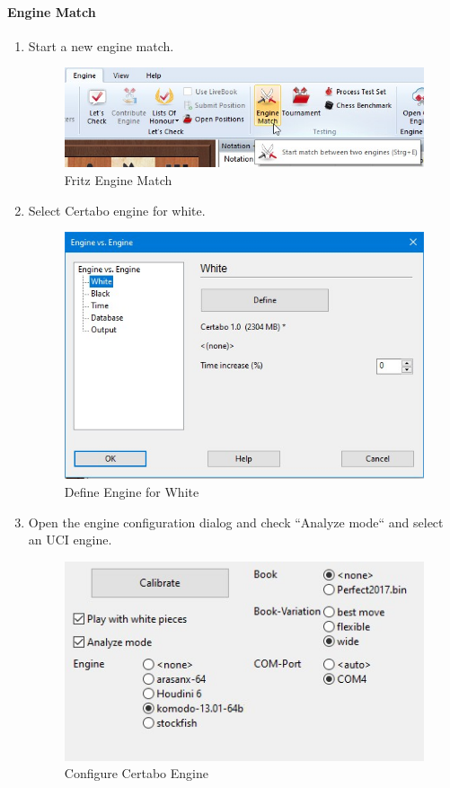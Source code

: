 \documentclass[11pt,a4paper]{article}
\begin{document}
\paragraph{Engine Match}
\begin{enumerate}
	\item Start a new engine match.
	\begin{figure}[H]
		\centering
		\includegraphics[scale=0.6]{fritz_enginematch.jpg}
		\caption{Fritz Engine Match}
		\label{fig:FritzEngineMatch}
	\end{figure}
	\item Select Certabo engine for white.
	\begin{figure}[H]
		\centering
		\includegraphics[scale=0.6]{fritz_enginewhite.jpg}
		\caption{Define Engine for White}
		\label{fig:FritzEngineWhite}
	\end{figure}
	\item Open the engine configuration dialog and check ``Analyze mode`` and select an UCI engine.
	\begin{figure}[H]
		\centering
		\includegraphics[scale=0.8]{fritz_engine_configure_certabo_analyze.jpg}
		\caption{Configure Certabo Engine}
		\label{fig:FritzConfigureCertabo}
	\end{figure}
	

\end{enumerate}
\end{document}
